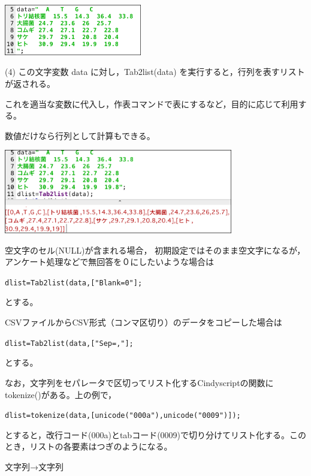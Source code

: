 \documentclass[papersize,a4paper,12pt,uplatex]{jsarticle}
\begin{document}
\begin{description}
\hspace{10mm} \includegraphics[bb=0 0 374.02 138.01 , width=6cm]{Fig/tab2list001.pdf}

\vspace{\baselineskip}
(4) この文字変数 data に対し，Tab2list(data) を実行すると，行列を表すリストが返される。

これを適当な変数に代入し，作表コマンドで表にするなど，目的に応じて利用する。

数値だけなら行列として計算もできる。

\vspace{\baselineskip} 
\hspace{10mm} \includegraphics[bb=0 0 622.53 228.51 , width=10cm]{Fig/tab2list03.pdf}

\vspace{\baselineskip}
空文字のセル(NULL)が含まれる場合， 初期設定ではそのまま空文字になるが，アンケート処理などで無回答を０にしたいような場合は

\hspace{10mm}\verb|dlist=Tab2list(data,["Blank=0"];|

とする。
 
 CSVファイルからCSV形式（コンマ区切り）のデータをコピーした場合は
 
\hspace{10mm}\verb|dlist=Tab2list(data,["Sep=,"];|

とする。
 
なお，文字列をセパレータで区切ってリスト化するCindyscriptの関数に tokenize()がある。上の例で，

\hspace{10mm} \verb|dlist=tokenize(data,[unicode("000a"),unicode("0009")]);|
 
とすると，改行コード(000a)とtabコード(0009)で切り分けてリスト化する。このとき，リストの各要素はつぎのようになる。

文字列→文字列


\end{description}
\end{document}
